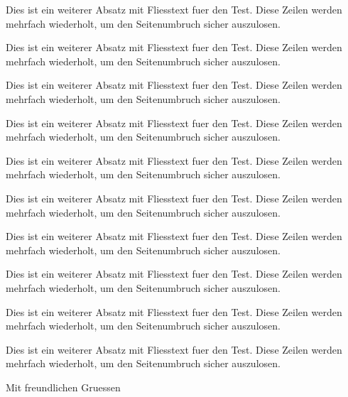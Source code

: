 \documentclass[basic]{../onlinebrief24}
\begin{document}
\begin{letter}{}
\par Dies ist ein weiterer Absatz mit Fliesstext fuer den Test. Diese Zeilen werden mehrfach wiederholt, um den Seitenumbruch sicher auszulosen.
\par Dies ist ein weiterer Absatz mit Fliesstext fuer den Test. Diese Zeilen werden mehrfach wiederholt, um den Seitenumbruch sicher auszulosen.
\par Dies ist ein weiterer Absatz mit Fliesstext fuer den Test. Diese Zeilen werden mehrfach wiederholt, um den Seitenumbruch sicher auszulosen.
\par Dies ist ein weiterer Absatz mit Fliesstext fuer den Test. Diese Zeilen werden mehrfach wiederholt, um den Seitenumbruch sicher auszulosen.
\par Dies ist ein weiterer Absatz mit Fliesstext fuer den Test. Diese Zeilen werden mehrfach wiederholt, um den Seitenumbruch sicher auszulosen.
\par Dies ist ein weiterer Absatz mit Fliesstext fuer den Test. Diese Zeilen werden mehrfach wiederholt, um den Seitenumbruch sicher auszulosen.
\par Dies ist ein weiterer Absatz mit Fliesstext fuer den Test. Diese Zeilen werden mehrfach wiederholt, um den Seitenumbruch sicher auszulosen.
\par Dies ist ein weiterer Absatz mit Fliesstext fuer den Test. Diese Zeilen werden mehrfach wiederholt, um den Seitenumbruch sicher auszulosen.
\par Dies ist ein weiterer Absatz mit Fliesstext fuer den Test. Diese Zeilen werden mehrfach wiederholt, um den Seitenumbruch sicher auszulosen.
\par Dies ist ein weiterer Absatz mit Fliesstext fuer den Test. Diese Zeilen werden mehrfach wiederholt, um den Seitenumbruch sicher auszulosen.

\closing{Mit freundlichen Gruessen}
\end{letter}
\end{document}
